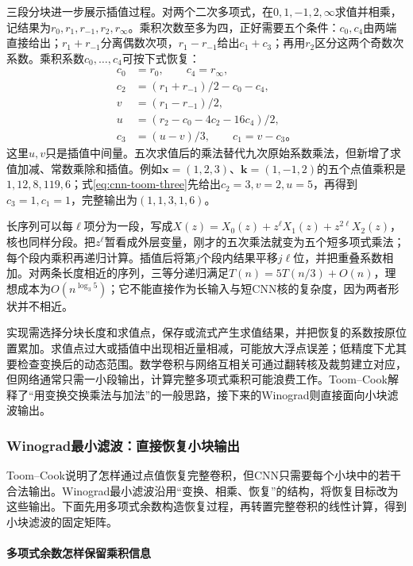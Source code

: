 三段分块进一步展示插值过程。对两个二次多项式，在$0,1,-1,2,\infty$求值并相乘，记结果为$r_0,r_1,r_{-1},r_2,r_\infty$。乘积次数至多为四，正好需要五个条件：$c_0,c_4$由两端直接给出；$r_1+r_{-1}$分离偶数次项，$r_1-r_{-1}$给出$c_1+c_3$；再用$r_2$区分这两个奇数次系数。乘积系数$c_0,\ldots,c_4$可按下式恢复：
\begin{equation}
  \begin{aligned}
    c_0&=r_0,\qquad c_4=r_\infty,\\
    c_2&=(r_1+r_{-1})/2-c_0-c_4,\\
    v&=(r_1-r_{-1})/2,\\
    u&=(r_2-c_0-4c_2-16c_4)/2,\\
    c_3&=(u-v)/3,\qquad c_1=v-c_3\text{。}
  \end{aligned}
  \label{eq:cnn-toom-three}
\end{equation}
这里$u,v$只是插值中间量。五次求值后的乘法替代九次原始系数乘法，但新增了求值加减、常数乘除和插值。例如$\bm x=(1,2,3)$、$\bm k=(1,-1,2)$的五个点值乘积是$1,12,8,119,6$；式\eqref{eq:cnn-toom-three}先给出$c_2=3,v=2,u=5$，再得到$c_3=1,c_1=1$，完整输出为$(1,1,3,1,6)$。

长序列可以每$\ell$项分为一段，写成$X(z)=X_0(z)+z^\ell X_1(z)+z^{2\ell}X_2(z)$，核也同样分段。把$z^\ell$暂看成外层变量，刚才的五次乘法就变为五个短多项式乘法；每个段内乘积再递归计算。插值后将第$j$个段内结果平移$j\ell$位，并把重叠系数相加。对两条长度相近的序列，三等分递归满足$T(n)=5T(n/3)+O(n)$，理想成本为$O(n^{\log_3 5})$；它不能直接作为长输入与短CNN核的复杂度，因为两者形状并不相近。

实现需选择分块长度和求值点，保存或流式产生求值结果，并把恢复的系数按原位置累加。求值点过大或插值中出现相近量相减，可能放大浮点误差；低精度下尤其要检查变换后的动态范围。数学卷积与网络互相关可通过翻转核及裁剪建立对应，但网络通常只需一小段输出，计算完整多项式乘积可能浪费工作。Toom--Cook解释了“用变换交换乘法与加法”的一般思路，接下来的Winograd则直接面向小块滤波输出。

\subsubsection{Winograd最小滤波：直接恢复小块输出}
\label{sec:cnn-winograd}

Toom--Cook说明了怎样通过点值恢复完整卷积，但CNN只需要每个小块中的若干合法输出。Winograd最小滤波沿用“变换、相乘、恢复”的结构，将恢复目标改为这些输出。下面先用多项式余数构造恢复过程，再转置完整卷积的线性计算，得到小块滤波的固定矩阵。

\paragraph{多项式余数怎样保留乘积信息}

